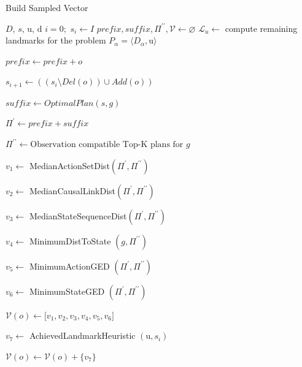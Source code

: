 \documentclass[letterpaper]{article}
\theoremstyle{plain}
\begin{document}
\setlength{\textfloatsep}{2pt}
\begin{algorithm}[tb]
        \caption{Build Sampled Vector}
        \label{alg:apx}
        \begin{algorithmic}[1]
                \Require $D$, $s$, $\mathrm{u}$, $\mathrm{d}$
                \State $i=0;$ $ s_{i} \gets I $
                \State $prefix,suffix,\Pi^{\prime\prime}, \mathcal{V} \gets \varnothing$
                        \State $\mathcal{L}_{u} \gets$ compute remaining landmarks for the problem $P_\alpha=\langle D_\alpha, \mathrm{u}\rangle$
                        \State \parbox[t]{0.95\linewidth}{$prefix \gets prefix + o$}
                        \State \parbox[t]{0.95\linewidth} 
                                {$s_{i+1} \gets ((s_{i} \setminus Del(o))\cup Add(o))$}
                                \State \parbox[t]{0.95\linewidth}{$suffix \gets OptimalPlan(s,g)$}
                                \State \parbox[t]{0.95\linewidth}{$\Pi^\prime \gets prefix + suffix$}
                                \State \parbox[t]{0.95\linewidth}{$\Pi^{\prime\prime} \gets \text{Observation compatible Top-K plans for } g$}
                                \State \parbox[t]{0.95\linewidth}{$v_1 \gets$ MedianActionSetDist$(\Pi^\prime, \Pi^{\prime\prime})$}
                                \State \parbox[t]{0.95\linewidth}{$v_2 \gets$ MedianCausalLinkDist$(\Pi^\prime, \Pi^{\prime\prime})$}
                                \State \parbox[t]{0.95\linewidth}{$v_3 \gets$ MedianStateSequenceDist$(\Pi^\prime,\Pi^{\prime\prime})$}
                                \State \parbox[t]{0.95\linewidth}{$v_4 \gets$ MinimumDistToState $(g,\Pi^{\prime\prime})$}
                                \State \parbox[t]{0.95\linewidth}{$v_5 \gets$ MinimumActionGED $(\Pi^\prime, \Pi^{\prime\prime})$}
                                \State \parbox[t]{0.95\linewidth}{$v_6 \gets$ MinimumStateGED $(\Pi^\prime, \Pi^{\prime\prime})$}
                                \State $\mathcal{V}(o) \gets \lbrack v_1,v_2,v_3,v_4,v_5,v_6\rbrack $
                        \EndFor
                        \State \parbox[t]{0.95\linewidth}{$v_7 \gets$ AchievedLandmarkHeuristic $(\mathrm{u},s_{i})$}
                        \State $\mathcal{V}(o) \gets \mathcal{V}(o)+\{v_7\}$
                \EndFor
                \EndProcedure
        \end{algorithmic}
\end{algorithm}
\end{document}
